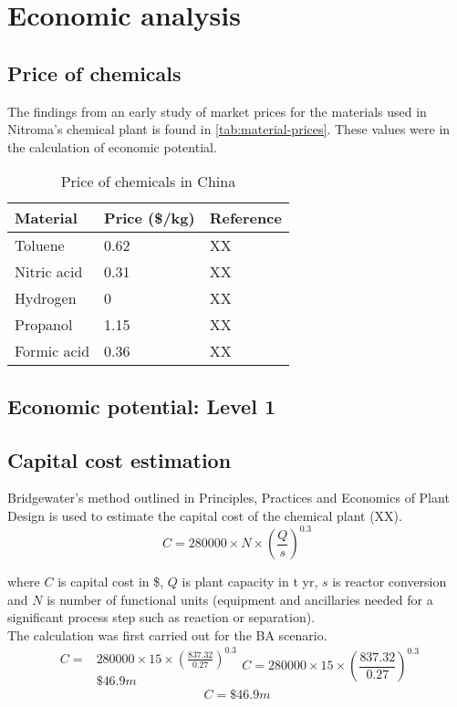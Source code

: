 \section{Economic analysis}
\label{app:economics}
\subsection{Price of chemicals}

The findings from an early study of market prices for the materials used in Nitroma's chemical plant is found in \cref{tab:material-prices}. These values were in the calculation of economic potential.

\begin{table}[]
\caption{Price of chemicals in China}
\label{material-prices}
\begin{tabular}{lll}
    \hline
    Material    & Price (\$/kg) & Reference \\ \hline
    Toluene     & 0.62          & XX        \\
    Nitric acid & 0.31          & XX        \\
    Hydrogen    & 0             & XX        \\
    Propanol    & 1.15          & XX        \\
    Formic acid & 0.36          & XX        \\ \hline
\end{tabular}
\end{table}

\subsection{Economic potential: Level 1}

\subsection{Capital cost estimation}

Bridgewater's method outlined in Principles, Practices and Economics of Plant Design is used to estimate the capital cost of the chemical plant (XX).
\begin{equation}
    C=280000 \times N \times (\frac{Q}{s})^0.3
\end{equation}

\noindent where $C$ is capital cost in \$, $Q$ is  plant capacity in t yr, $s$ is reactor conversion and $N$ is number of functional units (equipment and ancillaries needed for a significant process step such as reaction or separation).\\
The calculation was first carried out for the BA scenario.
\begin{equation}
\begin{split} 
C=& 280000 \times 15 \times (\frac{837.32}{0.27})^0.3  \\
 & \$46.9m 
\end{split}
    C=280000 \times 15 \times (\frac{837.32}{0.27})^0.3
\end{equation}
\begin{equation}
    C=\$46.9m
\end{equation}
    
